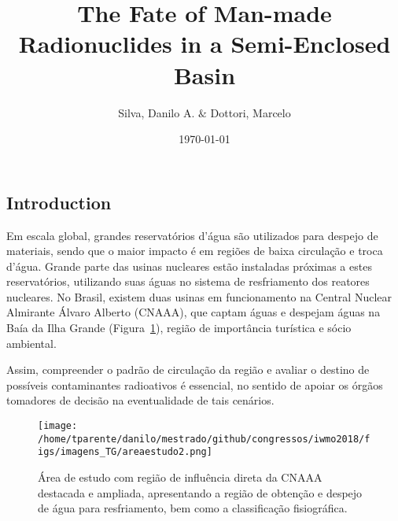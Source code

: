 \documentclass[final]{beamer}
\title
[24$^{o}$ Simpósio Internacional de Iniciação Científica da USP] %
{ %
The Fate of Man-made Radionuclides in a Semi-Enclosed Basin
}
\author{ Silva, Danilo A.\inst{1} $\&$ Dottori, Marcelo\inst{2}
}
\institute[Instituto Oceanográfico - Universidade de São Paulo]
{
Instituto Oceanográfico da Universidade de São Paulo (IOUSP)\\ [0.2ex]
\inst{1} danilo2.silva@usp.br; \inst{2} mdottori@usp.br
}
\date{\today}
\begin{document}
\begin{frame}
\begin{multicols}{2}

\section{Introduction}

Em escala global, grandes reservatórios d'água são utilizados para despejo de materiais,
sendo que o maior impacto é em regiões de baixa circulação e troca d'água. Grande
parte das usinas nucleares estão instaladas próximas a estes reservatórios, utilizando
suas águas no sistema de resfriamento dos reatores nucleares. No Brasil, existem
duas usinas em funcionamento na Central Nuclear Almirante Álvaro Alberto (CNAAA),
que captam águas e despejam águas na Baía da Ilha Grande (Figura~\ref{fig:areaestudo}),
região de importância turística e sócio ambiental.

Assim, compreender o padrão de circulação da região e avaliar o destino de possíveis
contaminantes radioativos é essencial, no sentido de apoiar os órgãos tomadores de decisão na
eventualidade de tais cenários.


\vspace{.1in}
\begin{figure}
\centering
\texttt{[image: /home/tparente/danilo/mestrado/github/congressos/iwmo2018/figs/imagens\_TG/areaestudo2.png]}
\vspace{.1in}
\caption{Área de estudo com região de influência direta da CNAAA destacada e ampliada, apresentando a região de obtenção e despejo de água para resfriamento, bem como a classificação fisiográfica.}
\label{fig:areaestudo}
\end{figure}
\vspace{-.5in}


\end{multicols}
\end{frame}
\end{document}
